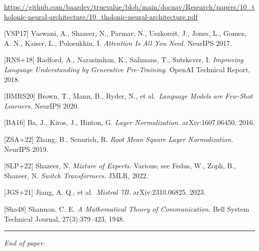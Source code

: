\documentclass[
  11pt,
  letterpaper,
]{article}
\begin{document}
\url{https://github.com/baardev/truevalue/blob/main/docnav/Research/papers/10_tholonic-neural-architecture/10_tholonic-neural-architecture.pdf}

{[}VSP17{]} Vaswani, A., Shazeer, N., Parmar, N., Uszkoreit, J., Jones,
L., Gomez, A. N., Kaiser, L., Polosukhin, I. \emph{Attention Is All You
Need.} NeurIPS 2017.

{[}RNS+18{]} Radford, A., Narasimhan, K., Salimans, T., Sutskever, I.
\emph{Improving Language Understanding by Generative Pre-Training.}
OpenAI Technical Report, 2018.

{[}BMRS20{]} Brown, T., Mann, B., Ryder, N., et al.~\emph{Language
Models are Few-Shot Learners.} NeurIPS 2020.

{[}BA16{]} Ba, J., Kiros, J., Hinton, G. \emph{Layer Normalization.}
arXiv:1607.06450, 2016.

{[}ZSA+22{]} Zhang, B., Sennrich, R. \emph{Root Mean Square Layer
Normalization.} NeurIPS 2019.

{[}SLP+22{]} Shazeer, N. \emph{Mixture of Experts.} Various; see Fedus,
W., Zoph, B., Shazeer, N. \emph{Switch Transformers.} JMLR, 2022.

{[}JGS+21{]} Jiang, A. Q., et al.~\emph{Mistral 7B.} arXiv:2310.06825,
2023.

{[}Sha48{]} Shannon, C. E. \emph{A Mathematical Theory of
Communication.} Bell System Technical Journal, 27(3):379--423, 1948.

\begin{center}\rule{0.5\linewidth}{0.5pt}\end{center}

\emph{End of paper.}
\end{document}
